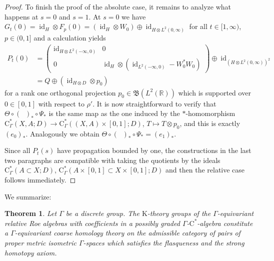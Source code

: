 \documentclass[pdftex]{sigma}
\numberwithin{equation}{section}
\newtheorem{thm}{Theorem}[section]
\theoremstyle{definition}
\newcommand{\R}{\mathbb{R}}
\DeclareMathOperator{\id}{id}
\newcommand{\ev}[1]{\mathop{\textrm{ev}_{#1}}}
\newcommand{\K}{\mathrm{K}}
\newcommand{\textCstar}{\ensuremath{\mathrm{C}^*\!}}
\newcommand{\Roe}{\mathrm{C}^*}
\newcommand{\Lin}{{\mathfrak{B}}}
\begin{document}
\begin{proof}
To finish the proof of the absolute case, it remains to analyze what happens at $s=0$ and $s=1$.
At $s=0$ we have $G_t(0)=\id_H\otimes F_p(0)=(\id_H\otimes W_0)\oplus\id_{H\otimes L^2(0,\infty)}$ for all $t\in[1,\infty)$, $p\in(0,1]$ and a calculation yields
\begin{align*}
P_t(0)&=\begin{pmatrix}\id_{H\otimes L^2(-\infty,0)}&0\\0&\id_H\otimes(\id_{L^2(-\infty,0)}-W_0^*W_0)\end{pmatrix}\oplus\id_{(H\otimes L^2(0,\infty))^2}
\\[.5ex]
&=Q\oplus (\id_{H\otimes D}\otimes p_0)
\end{align*}
for a rank one orthogonal projection $p_0\in \Lin(L^2(\R))$ which is supported over $0\in[0,1]$ with respect to $\rho'$. It is now straightforward to verify that $\Theta\circ(\ev{0})_*\circ\Psi_*$ is the same map as the one induced by the $*$-homomorphism $\Roe_\Gamma(X,A;D)\to \Roe_\Gamma((X,A)\times[0,1];D)$, $T\mapsto T\otimes p_0$, and this is exactly $(e_0)_*$. Analogously we obtain $\Theta\circ(\ev{1})_*\circ\Psi_*=(e_1)_*$.

Since all $P_t(s)$ have propagation bounded by one, the constructions in the last two paragraphs are compatible with taking the quotients by the ideals $\Roe_\Gamma(A\subset X;D)$, $\Roe_\Gamma(A\times [0,1]\subset X\times [0,1];D)$ and then the relative case follows immediately.
\end{proof}

We summarize:
\begin{thm}
Let $\Gamma$ be a discrete group.
The $\K$-theory groups of the $\Gamma$-equivariant relative Roe algebras with coefficients in a possibly graded $\Gamma$-\textCstar-algebra constitute a $\Gamma$-equivariant coarse homology theory on the admissible category of pairs of proper metric isometric $\Gamma$-spaces which satisfies the flasqueness and the strong homotopy axiom.
\end{thm}
\end{document}
